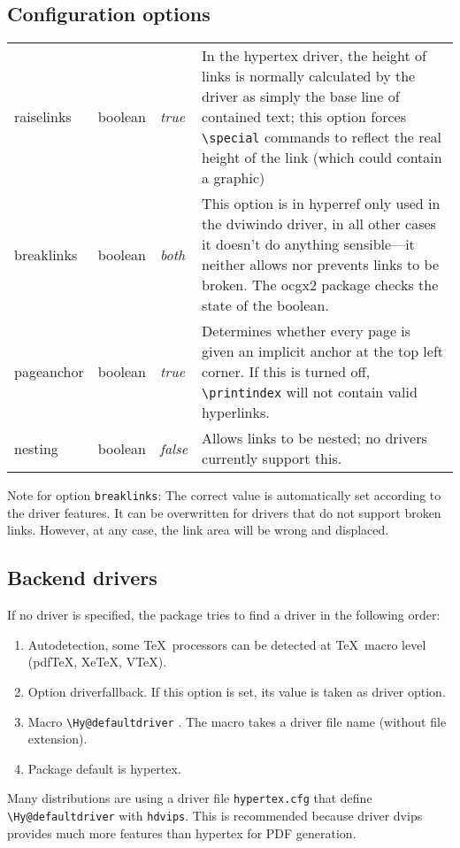\documentclass{article}
\newcommand*{\cs}[1]{%
  \texttt{\textbackslash #1}%
}
\newcommand*{\xpackage}[1]{\textsf{#1}}
\begin{document}
       

\subsection{Configuration options}

\begin{longtable}{>{\ttfamily}ll>{\itshape}lp{9cm}}
raiselinks & boolean & true  & In the hypertex driver, the height of links is normally calculated by the driver as
                               simply the base line of contained text; this option forces \verb|\special| commands to
                               reflect the real height of the link (which could contain a graphic) \\
breaklinks & boolean & both & This option is in \xpackage{hyperref} only used in the dviwindo driver, in all other cases it doesn't do anything sensible---it neither allows nor prevents links to be broken. The ocgx2 package
checks the state of the boolean.\\
pageanchor & boolean & true  & Determines whether every page is given an implicit anchor at the top left corner. If this
                               is turned off, \verb|\printindex| will not contain
                               valid hyperlinks. \\
nesting    & boolean & false & Allows links to be nested; no drivers currently support this.
\end{longtable}

Note for option \verb|breaklinks|:
The correct value is automatically set according to the driver features.
It can be overwritten for drivers that do not support broken links.
However, at any case, the link area will be wrong and displaced.

\subsection{Backend drivers}

If no driver is specified, the package tries to find a driver in
the following order:
\begin{enumerate}
\item Autodetection, some \TeX\ processors can be detected at \TeX\ macro
  level (pdf\TeX, Xe\TeX, V\TeX).
\item Option \textsf{driverfallback}. If this option is set, its value
  is taken as driver option.
\item Macro \cs{Hy@defaultdriver}. The macro takes a driver file
  name (without file extension).
\item Package default is \textsf{hypertex}.
\end{enumerate}
Many distributions are using a driver file \texttt{hypertex.cfg} that
define \cs{Hy@defaultdriver} with \texttt{hdvips}. This is recommended
because driver \textsf{dvips} provides much more features than
\textsf{hypertex} for PDF generation.
\end{document}
